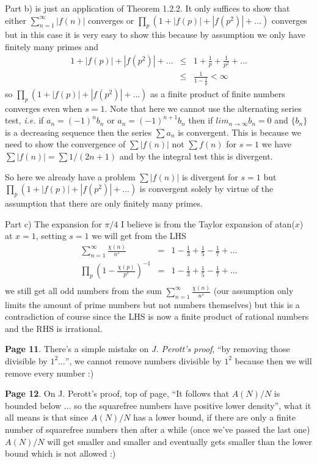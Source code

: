 \documentclass[aps,preprint,preprintnumbers,nofootinbib,showpacs,prd]{revtex4-1}
\newcommand{\ie}{{\it i.e.} }
\newcommand{\nbea}{\begin{eqnarray*}}
\newcommand{\neea}{\end{eqnarray*}}
\begin{document}
Part b) is just an application of Theorem 1.2.2. It only suffices to show that either $\sum_{n=1}^\infty |f(n)|$ converges or $\prod_p (1 + |f(p)| + |f(p^2)| + \dots)$ converges but in this case it is very easy to show this because by assumption we only have finitely many primes and 
%
\nbea
1 + |f(p)| + |f(p^2)| + \dots & \le & 1 + \frac{1}{p} + \frac{1}{p^2} + \dots \\
& \le & \frac{1}{1 - \frac{1}{p}} < \infty
\neea
%
so $\prod_p (1 + |f(p)| + |f(p^2)| + \dots)$ as a finite product of finite numbers converges even when $s=1$. Note that here we cannot use the alternating series test, \ie if $a_n = (-1)^n b_n$ or $a_n = (-1)^{n+1}b_n$ then if $lim_{n\to\infty}b_n = 0$ and $\{b_n\}$ is a decreasing sequence then the series $\sum a_n$ is convergent. This is because we need to show the convergence of $\sum |f(n)|$ not $\sum f(n)$ for $s=1$ we have $\sum |f(n)| = \sum 1/(2n+1)$ and by the integral test this is divergent.

So here we already have a problem $\sum |f(n)|$ is divergent for $s=1$ but $\prod_p (1 + |f(p)| + |f(p^2)| + \dots)$ is convergent solely by virtue of the assumption that there are only finitely many primes.

Part c) The expansion for $\pi/4$ I believe is from the Taylor expansion of atan($x$) at $x=1$, setting $s = 1$ we will get  from the LHS
%
\nbea
\sum_{n=1}^\infty \frac{\chi(n)}{n^s} & = & 1 - \frac{1}{3} + \frac{1}{5} - \frac{1}{7} + \dots \\
\prod_p \left( 1 - \frac{\chi(p)}{p^s}\right )^{-1} & = & 1 - \frac{1}{3} + \frac{1}{5} - \frac{1}{7} + \dots \\
\neea
%
we still get all odd numbers from the sum $\sum_{n=1}^\infty \frac{\chi(n)}{n^s}$ (our assumption only limits the amount of prime numbers but not numbers themselves) but this is a contradiction of course since the LHS is now a finite product of rational numbers and the RHS is irrational.

{\bf Page 11}. There's a simple mistake on {\it J. Perott's proof}, ``by removing those divisible by $1^2 \dots$'', we cannot remove numbers divisible by $1^2$ because then we will remove every number :)

{\bf Page 12}. On J. Perott's proof, top of page, ``It follows that $A(N)/N$ is bounded below $\dots$ so the squarefree numbers have positive lower density'', what it all means is that since $A(N)/N$ has a lower bound, if there are only a finite number of squarefree numbers then after a while (once we've passed the last one) $A(N)/N$ will get smaller and smaller and eventually gets smaller than the lower bound which is not allowed :)
\end{document}
